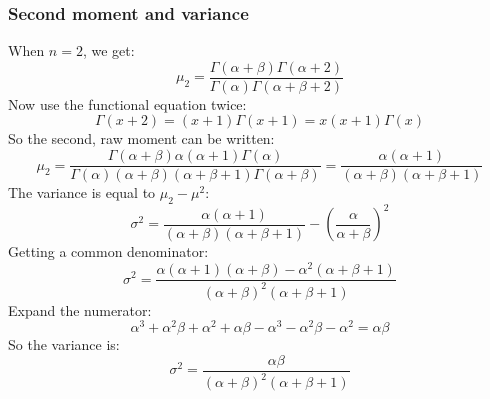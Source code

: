 \documentclass[12pt, a4paper]{article}
\begin{document}
\subsubsection{Second moment and variance}
When $n=2$, we get:
\begin{equation}
\mu_2=\frac{\Gamma(\alpha+\beta)\Gamma(\alpha+2)}{\Gamma(\alpha)\Gamma(\alpha+\beta+2)}
\end{equation}
Now use the functional equation twice:
\begin{equation}
\Gamma(x+2)=(x+1)\Gamma(x+1)=x(x+1)\Gamma(x)
\end{equation}
So the second, raw moment can be written:
\begin{equation}
\mu_2=\frac{\Gamma(\alpha+\beta)\alpha(\alpha+1)\Gamma(\alpha)}{\Gamma(\alpha)(\alpha+\beta)(\alpha+\beta+1)\Gamma(\alpha+\beta)}=\frac{\alpha(\alpha+1)}{(\alpha+\beta)(\alpha+\beta+1)}
\end{equation}
The variance is equal to $\mu_2-\mu^2$:
\begin{equation}
\sigma^2=\frac{\alpha(\alpha+1)}{(\alpha+\beta)(\alpha+\beta+1)}-\left(\frac{\alpha}{\alpha+\beta}\right)^2
\end{equation}
Getting a common denominator:
\begin{equation}
\sigma^2=\frac{\alpha(\alpha+1)(\alpha+\beta)-\alpha^2(\alpha+\beta+1)}{(\alpha+\beta)^2(\alpha+\beta+1)}
\end{equation}
Expand the numerator:
\begin{equation}
\alpha^3+\alpha^2\beta+\alpha^2+\alpha\beta-\alpha^3-\alpha^2\beta-\alpha^2=\alpha\beta
\end{equation}
So the variance is:
\begin{equation}
\sigma^2=\frac{\alpha\beta}{(\alpha+\beta)^2(\alpha+\beta+1)}
\end{equation}
\end{document}
